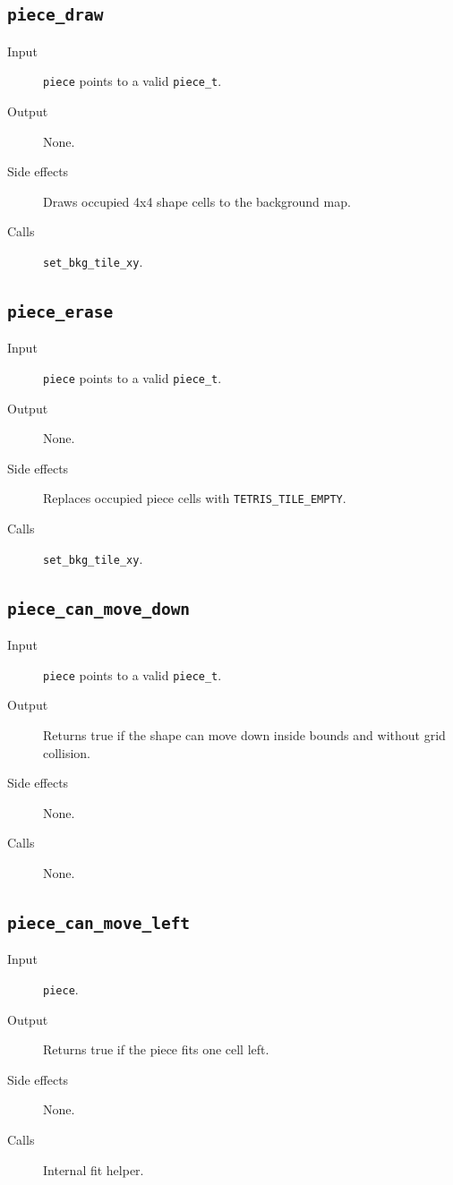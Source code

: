 \subsection*{\texttt{piece\_draw}}
\begin{description}
  \item[Input] \texttt{piece} points to a valid \texttt{piece\_t}.
  \item[Output] None.
  \item[Side effects] Draws occupied 4x4 shape cells to the background map.
  \item[Calls] \texttt{set\_bkg\_tile\_xy}.
\end{description}

\subsection*{\texttt{piece\_erase}}
\begin{description}
  \item[Input] \texttt{piece} points to a valid \texttt{piece\_t}.
  \item[Output] None.
  \item[Side effects] Replaces occupied piece cells with \texttt{TETRIS\_TILE\_EMPTY}.
  \item[Calls] \texttt{set\_bkg\_tile\_xy}.
\end{description}

\subsection*{\texttt{piece\_can\_move\_down}}
\begin{description}
  \item[Input] \texttt{piece} points to a valid \texttt{piece\_t}.
  \item[Output] Returns true if the shape can move down inside bounds and without grid collision.
  \item[Side effects] None.
  \item[Calls] None.
\end{description}

\subsection*{\texttt{piece\_can\_move\_left}}
\begin{description}
  \item[Input] \texttt{piece}.
  \item[Output] Returns true if the piece fits one cell left.
  \item[Side effects] None.
  \item[Calls] Internal fit helper.
\end{description}

